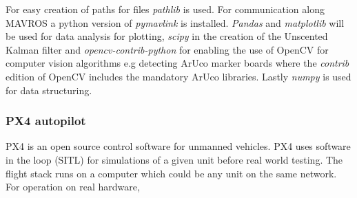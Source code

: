 \documentclass[../Head/report.tex]{subfiles}
\begin{document}
For easy creation of paths for files \textit{pathlib} is used. For communication along MAVROS a python version of \textit{pymavlink} is installed. \textit{Pandas} and \textit{matplotlib} will be used for data analysis for plotting, \textit{scipy} in the creation of the Unscented Kalman filter and \textit{opencv-contrib-python} for enabling the use of OpenCV for computer vision algorithms e.g detecting ArUco marker boards where the \textit{contrib} edition of OpenCV includes the  mandatory ArUco libraries. Lastly \textit{numpy} is used for data structuring.      

\subsubsection{PX4 autopilot}
\label{sec:px4_flight_stack}

PX4 is an open source control software for unmanned vehicles. PX4 uses software in the loop (SITL) for simulations of a given unit before real world testing. The flight stack runs on a computer which could be any unit on the same network. For operation on real hardware,    
\end{document}
